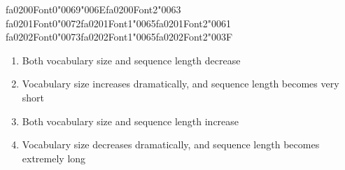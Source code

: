 \documentclass[12pt]{article}
\begin{document}
\begin{enumerate}[label=Q\arabic*.]
{\csname fa0200Font0\endcsname\char"0069}{\char"006E}{\csname fa0200Font2\endcsname\char"0063} {\csname fa0201Font0\endcsname\char"0072}{\csname fa0201Font1\endcsname\char"0065}{\csname fa0201Font2\endcsname\char"0061} {\csname fa0202Font0\endcsname\char"0073}{\csname fa0202Font1\endcsname\char"0065}{\csname fa0202Font2\endcsname\char"003F}
 \begin{enumerate}[label=(\Alph*)]
     \item Both vocabulary size and sequence length decrease
     \item Vocabulary size increases dramatically, and sequence length becomes very short
     \item Both vocabulary size and sequence length increase
     \item Vocabulary size decreases dramatically, and sequence length becomes extremely long
 \end{enumerate}
 

\end{enumerate}
\end{document}
